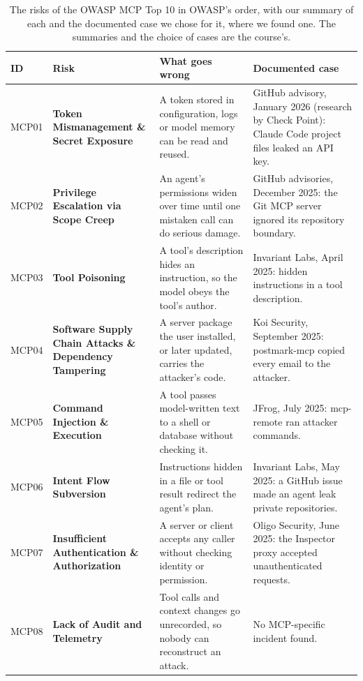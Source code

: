 \begin{table}[tb]
  \caption{The risks of the OWASP MCP Top 10 in OWASP's order, with our summary of each and the
  documented case we chose for it, where we found one. The summaries and the choice of cases are
  the course's.}
  \label{tab:threats-cases}
  \begin{adjustbox}{width=\textwidth}\begin{tabularx}{\textwidth}{L{0.065\textwidth}L{0.2\textwidth}L{0.33\textwidth}X}
    \toprule
    \textbf{ID} & \textbf{Risk} & \textbf{What goes wrong} & \textbf{Documented case} \\
    \midrule
    MCP01 & \textbf{Token Mismanagement \& Secret Exposure} & A token stored in configuration, logs or model memory can be read and reused. & GitHub advisory, January 2026 (research by Check Point): Claude Code project files leaked an API key. \\
    MCP02 & \textbf{Privilege Escalation via Scope Creep} & An agent's permissions widen over time until one mistaken call can do serious damage. & GitHub advisories, December 2025: the Git MCP server ignored its repository boundary. \\
    MCP03 & \textbf{Tool Poisoning} & A tool's description hides an instruction, so the model obeys the tool's author. & Invariant Labs, April 2025: hidden instructions in a tool description. \\
    MCP04 & \textbf{Software Supply Chain Attacks \& Dependency Tampering} & A server package the user installed, or later updated, carries the attacker's code. & Koi Security, September 2025: postmark-mcp copied every email to the attacker. \\
    MCP05 & \textbf{Command Injection \& Execution} & A tool passes model-written text to a shell or database without checking it. & JFrog, July 2025: mcp-remote ran attacker commands. \\
    MCP06 & \textbf{Intent Flow Subversion} & Instructions hidden in a file or tool result redirect the agent's plan. & Invariant Labs, May 2025: a GitHub issue made an agent leak private repositories. \\
    MCP07 & \textbf{Insufficient Authentication \& Authorization} & A server or client accepts any caller without checking identity or permission. & Oligo Security, June 2025: the Inspector proxy accepted unauthenticated requests. \\
    MCP08 & \textbf{Lack of Audit and Telemetry} & Tool calls and context changes go unrecorded, so nobody can reconstruct an attack. & No MCP-specific incident found. \\

\end{tabularx}
\end{adjustbox}
\end{table}
